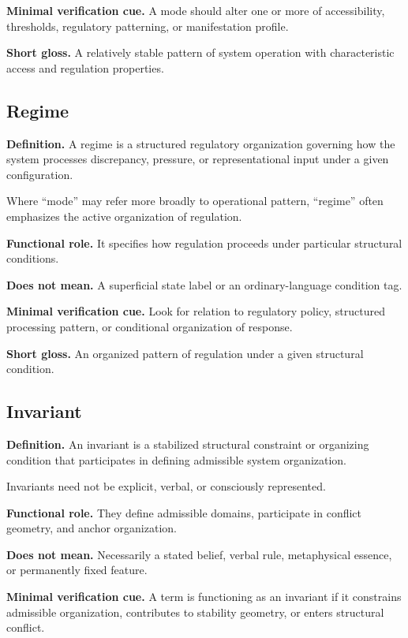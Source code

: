 \documentclass[11pt,a4paper]{article}
\begin{document}
	\textbf{Minimal verification cue.} A mode should alter one or more of accessibility, thresholds, regulatory patterning, or manifestation profile.
	
	\textbf{Short gloss.} A relatively stable pattern of system operation with characteristic access and regulation properties.
	
	\subsection{Regime}
	
	\textbf{Definition.} A regime is a structured regulatory organization governing how the system processes discrepancy, pressure, or representational input under a given configuration.
	
	Where ``mode'' may refer more broadly to operational pattern, ``regime'' often emphasizes the active organization of regulation.
	
	\textbf{Functional role.} It specifies how regulation proceeds under particular structural conditions.
	
	\textbf{Does not mean.} A superficial state label or an ordinary-language condition tag.
	
	\textbf{Minimal verification cue.} Look for relation to regulatory policy, structured processing pattern, or conditional organization of response.
	
	\textbf{Short gloss.} An organized pattern of regulation under a given structural condition.
	
	\subsection{Invariant}
	
	\textbf{Definition.} An invariant is a stabilized structural constraint or organizing condition that participates in defining admissible system organization.
	
	Invariants need not be explicit, verbal, or consciously represented.
	
	\textbf{Functional role.} They define admissible domains, participate in conflict geometry, and anchor organization.
	
	\textbf{Does not mean.} Necessarily a stated belief, verbal rule, metaphysical essence, or permanently fixed feature.
	
	\textbf{Minimal verification cue.} A term is functioning as an invariant if it constrains admissible organization, contributes to stability geometry, or enters structural conflict.
	
\end{document}
